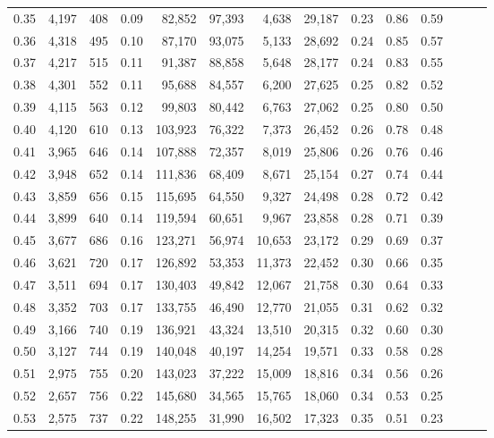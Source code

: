 \begin{tabular}{rrrrrrrrrrrrrr}
0.35 &  4,197 &  408 &  0.09 &   82,852 &   97,393 &   4,638 &  29,187 &  0.23 &  0.86 &      0.59 \\
0.36 &  4,318 &  495 &  0.10 &   87,170 &   93,075 &   5,133 &  28,692 &  0.24 &  0.85 &      0.57 \\
0.37 &  4,217 &  515 &  0.11 &   91,387 &   88,858 &   5,648 &  28,177 &  0.24 &  0.83 &      0.55 \\
0.38 &  4,301 &  552 &  0.11 &   95,688 &   84,557 &   6,200 &  27,625 &  0.25 &  0.82 &      0.52 \\
0.39 &  4,115 &  563 &  0.12 &   99,803 &   80,442 &   6,763 &  27,062 &  0.25 &  0.80 &      0.50 \\
0.40 &  4,120 &  610 &  0.13 &  103,923 &   76,322 &   7,373 &  26,452 &  0.26 &  0.78 &      0.48 \\
0.41 &  3,965 &  646 &  0.14 &  107,888 &   72,357 &   8,019 &  25,806 &  0.26 &  0.76 &      0.46 \\
0.42 &  3,948 &  652 &  0.14 &  111,836 &   68,409 &   8,671 &  25,154 &  0.27 &  0.74 &      0.44 \\
0.43 &  3,859 &  656 &  0.15 &  115,695 &   64,550 &   9,327 &  24,498 &  0.28 &  0.72 &      0.42 \\
0.44 &  3,899 &  640 &  0.14 &  119,594 &   60,651 &   9,967 &  23,858 &  0.28 &  0.71 &      0.39 \\
0.45 &  3,677 &  686 &  0.16 &  123,271 &   56,974 &  10,653 &  23,172 &  0.29 &  0.69 &      0.37 \\
0.46 &  3,621 &  720 &  0.17 &  126,892 &   53,353 &  11,373 &  22,452 &  0.30 &  0.66 &      0.35 \\
0.47 &  3,511 &  694 &  0.17 &  130,403 &   49,842 &  12,067 &  21,758 &  0.30 &  0.64 &      0.33 \\
0.48 &  3,352 &  703 &  0.17 &  133,755 &   46,490 &  12,770 &  21,055 &  0.31 &  0.62 &      0.32 \\
0.49 &  3,166 &  740 &  0.19 &  136,921 &   43,324 &  13,510 &  20,315 &  0.32 &  0.60 &      0.30 \\
0.50 &  3,127 &  744 &  0.19 &  140,048 &   40,197 &  14,254 &  19,571 &  0.33 &  0.58 &      0.28 \\
0.51 &  2,975 &  755 &  0.20 &  143,023 &   37,222 &  15,009 &  18,816 &  0.34 &  0.56 &      0.26 \\
0.52 &  2,657 &  756 &  0.22 &  145,680 &   34,565 &  15,765 &  18,060 &  0.34 &  0.53 &      0.25 \\
0.53 &  2,575 &  737 &  0.22 &  148,255 &   31,990 &  16,502 &  17,323 &  0.35 &  0.51 &      0.23 \\

\end{tabular}
